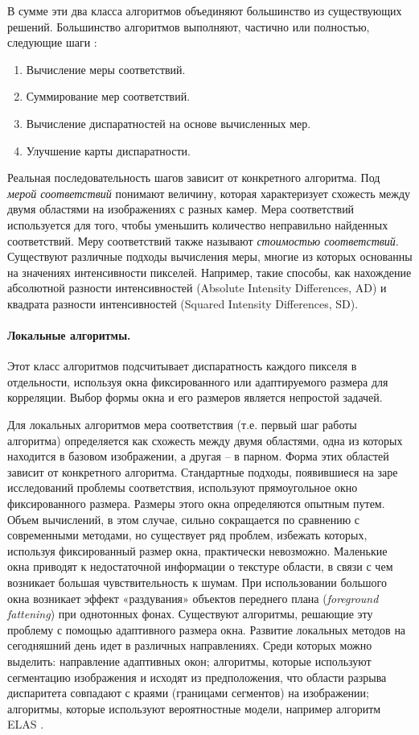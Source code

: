 \documentclass[oneside,final,12pt]{scrartcl}
\begin{document}
			В сумме эти два класса алгоритмов объединяют большинство из существующих решений. Большинство алгоритмов выполняют, частично или полностью, следующие шаги \cite{Scharstein2002}:
			\begin{enumerate}
				\item Вычисление меры соответствий.
				\item Суммирование мер соответствий.
				\item Вычисление диспаратностей на основе вычисленных мер.
				\item Улучшение карты диспаратности.
			\end{enumerate}
			Реальная последовательность шагов зависит от конкретного алгоритма. Под \textit{мерой соответствий} понимают величину, которая характеризует схожесть между двумя областями на изображениях с разных камер. Мера соответствий используется для того, чтобы уменьшить количество неправильно найденных соответствий. Меру соответствий также называют \textit{стоимостью соответствий}. Существуют различные подходы вычисления меры, многие из которых основанны на значениях интенсивности пикселей. Например, такие способы, как нахождение абсолютной разности интенсивностей (Absolute Intensity Differences, AD) и квадрата разности интенсивностей (Squared Intensity Differences, SD).

			\paragraph{Локальные алгоритмы.} Этот класс алгоритмов подсчитывает диспаратность каждого пикселя в отдельности, используя окна фиксированного или адаптируемого размера для корреляции. Выбор формы окна и его размеров является непростой задачей.

			Для локальных алгоритмов мера соответствия (т.е. первый шаг работы алгоритма) определяется как схожесть между двумя областями, одна из которых находится в базовом изображении, а	другая -- в парном. Форма этих областей зависит от конкретного алгоритма. Стандартные	подходы, появившиеся на заре исследований проблемы соответствия, используют прямоугольное окно фиксированного размера. Размеры этого окна определяются опытным путем. Объем вычислений, в этом случае, сильно сокращается по сравнению с современными	методами, но существует ряд проблем, избежать которых, используя	фиксированный размер окна, практически невозможно. Маленькие окна приводят к недостаточной информации о текстуре области, в связи с чем возникает большая чувствительность к шумам. При использовании большого окна возникает эффект «раздувания» объектов	переднего плана (\textit{foreground fattening}) при однотонных фонах. Существуют алгоритмы, решающие эту проблему с помощью адаптивного размера окна. Развитие локальных методов на сегодняшний день идет в различных направлениях. Среди которых можно выделить: направление адаптивных окон; алгоритмы, которые используют сегментацию изображения и исходят из предположения, что области разрыва диспаритета совпадают с краями (границами сегментов) на изображении; алгоритмы, которые используют вероятностные модели, например алгоритм ELAS \cite{Geiger2010}.
\end{document}
